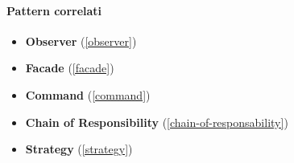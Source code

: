 \paragraph{Pattern correlati}
\begin{itemize}
    \item \textbf{Observer} (\ref{observer})
    \item \textbf{Facade} (\ref{facade})
    \item \textbf{Command} (\ref{command})
    \item \textbf{Chain of Responsibility} (\ref{chain-of-responsability})
    \item \textbf{Strategy} (\ref{strategy})
\end{itemize}

\newpage